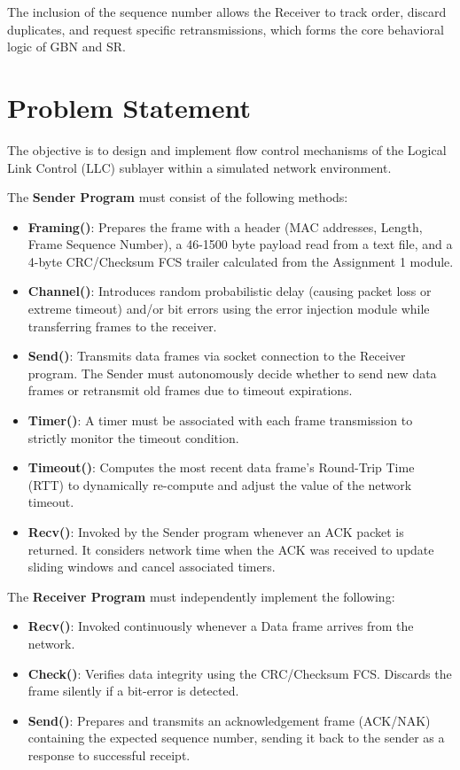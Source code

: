 \documentclass[12pt]{article}
\begin{document}
The inclusion of the sequence number allows the Receiver to track order, discard duplicates, and request specific retransmissions, which forms the core behavioral logic of GBN and SR.

\section{Problem Statement}
The objective is to design and implement flow control mechanisms of the Logical Link Control (LLC) sublayer within a simulated network environment. 

The \textbf{Sender Program} must consist of the following methods:
\begin{itemize}
    \item \textbf{Framing()}: Prepares the frame with a header (MAC addresses, Length, Frame Sequence Number), a 46-1500 byte payload read from a text file, and a 4-byte CRC/Checksum FCS trailer calculated from the Assignment 1 module.
    \item \textbf{Channel()}: Introduces random probabilistic delay (causing packet loss or extreme timeout) and/or bit errors using the error injection module while transferring frames to the receiver.
    \item \textbf{Send()}: Transmits data frames via socket connection to the Receiver program. The Sender must autonomously decide whether to send new data frames or retransmit old frames due to timeout expirations.
    \item \textbf{Timer()}: A timer must be associated with each frame transmission to strictly monitor the timeout condition.
    \item \textbf{Timeout()}: Computes the most recent data frame's Round-Trip Time (RTT) to dynamically re-compute and adjust the value of the network timeout.
    \item \textbf{Recv()}: Invoked by the Sender program whenever an ACK packet is returned. It considers network time when the ACK was received to update sliding windows and cancel associated timers.
\end{itemize}

The \textbf{Receiver Program} must independently implement the following:
\begin{itemize}
    \item \textbf{Recv()}: Invoked continuously whenever a Data frame arrives from the network.
    \item \textbf{Check()}: Verifies data integrity using the CRC/Checksum FCS. Discards the frame silently if a bit-error is detected.
    \item \textbf{Send()}: Prepares and transmits an acknowledgement frame (ACK/NAK) containing the expected sequence number, sending it back to the sender as a response to successful receipt.
\end{itemize}
\end{document}
